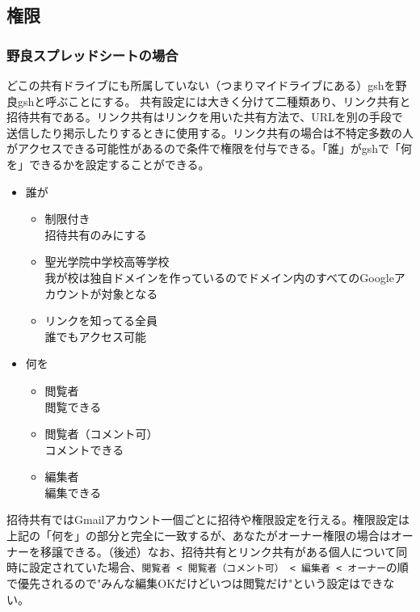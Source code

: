 \documentclass[a4paper]{ltjsreport}
\newcommand{\terlogy}[2][|]{\colorbox{terlogy}{\texttt{\lstinline#1#2#1}}}
\begin{document}
\subsection{権限}
\subsubsection{野良スプレッドシートの場合}
どこの共有ドライブにも所属していない（つまりマイドライブにある）gshを野良gshと呼ぶことにする。
共有設定には大きく分けて二種類あり、リンク共有と招待共有である。リンク共有はリンクを用いた共有方法で、URLを別の手段で送信したり掲示したりするときに使用する。リンク共有の場合は不特定多数の人がアクセスできる可能性があるので条件で権限を付与できる。「誰」がgshで「何を」できるかを設定することができる。
\begin{itemize}
  \item 誰が
        \begin{itemize}
          \item 制限付き\\
                招待共有のみにする
          \item 聖光学院中学校高等学校\\
                我が校は独自ドメインを作っているのでドメイン内のすべてのGoogleアカウントが対象となる
          \item リンクを知ってる全員\\
                誰でもアクセス可能
        \end{itemize}
  \item 何を
        \begin{itemize}
          \item 閲覧者\\
                閲覧できる
          \item 閲覧者（コメント可）\\
                コメントできる
          \item 編集者\\
                編集できる
        \end{itemize}
\end{itemize}
招待共有ではGmailアカウント一個ごとに招待や権限設定を行える。権限設定は上記の「何を」の部分と完全に一致するが、あなたがオーナー権限の場合はオーナーを移譲できる。（後述）なお、招待共有とリンク共有がある個人について同時に設定されていた場合、\terlogy{閲覧者 < 閲覧者（コメント可） < 編集者 < オーナー}の順で優先されるので"みんな編集OKだけどいつは閲覧だけ"という設定はできない。
\\
\end{document}
